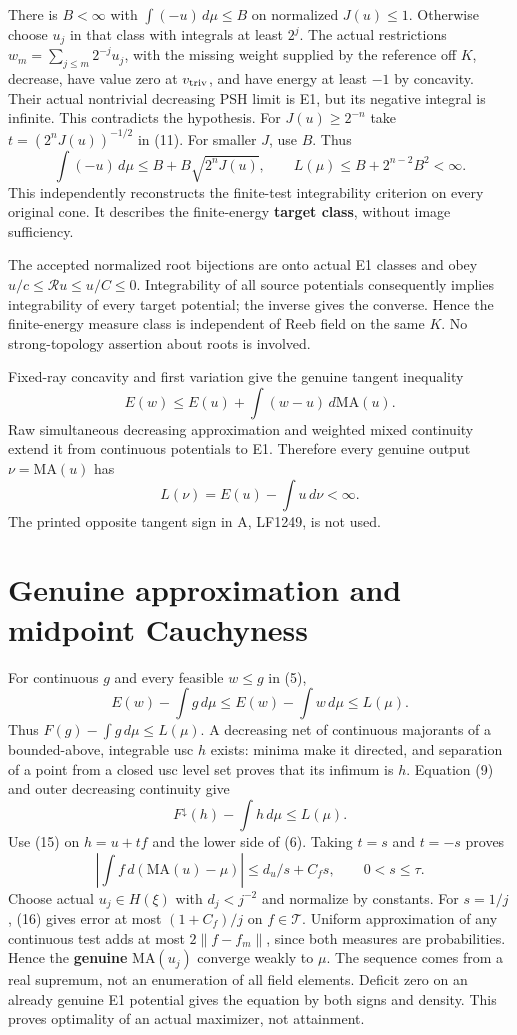 \documentclass[
  10pt,
]{article}
\begin{document}
There is \(B<\infty\) with \(\int(-u)\,d\mu\le B\) on normalized
\(J(u)\le1\). Otherwise choose \(u_j\) in that class with integrals at
least \(2^j\). The actual restrictions \(w_m=\sum_{j\le m}2^{-j}u_j\),
with the missing weight supplied by the reference off \(K\), decrease,
have value zero at \(v_{\rm triv}\), and have energy at least \(-1\) by
concavity. Their actual nontrivial decreasing PSH limit is E1, but its
negative integral is infinite. This contradicts the hypothesis. For
\(J(u)\ge2^{-n}\) take \(t=(2^nJ(u))^{-1/2}\) in (11). For smaller
\(J\), use \(B\). Thus \[\int(-u)\,d\mu\le B+B\sqrt{2^nJ(u)},\qquad
 L(\mu)\le B+2^{n-2}B^2<\infty. \tag{12}\] This independently
reconstructs the finite-test integrability criterion on every original
cone. It describes the finite-energy \textbf{target class}, without
image sufficiency.

The accepted normalized root bijections are onto actual E1 classes and
obey \(u/c\le\mathcal R u\le u/C\le0\). Integrability of all source
potentials consequently implies integrability of every target potential;
the inverse gives the converse. Hence the finite-energy measure class is
independent of Reeb field on the same \(K\). No strong-topology
assertion about roots is involved.

Fixed-ray concavity and first variation give the genuine tangent
inequality \[E(w)\le E(u)+\int(w-u)\,d\mathrm{MA}(u). \tag{13}\] Raw
simultaneous decreasing approximation and weighted mixed continuity
extend it from continuous potentials to E1. Therefore every genuine
output \(\nu=\mathrm{MA}(u)\) has
\[L(\nu)=E(u)-\int u\,d\nu<\infty. \tag{14}\] The printed opposite
tangent sign in A, LF1249, is not used.

\section{Genuine approximation and midpoint
Cauchyness}\label{genuine-approximation-and-midpoint-cauchyness}

For continuous \(g\) and every feasible \(w\le g\) in (5),
\[E(w)-\int g\,d\mu\le E(w)-\int w\,d\mu\le L(\mu).\] Thus
\(F(g)-\int g\,d\mu\le L(\mu)\). A decreasing net of continuous
majorants of a bounded-above, integrable usc \(h\) exists: minima make
it directed, and separation of a point from a closed usc level set
proves that its infimum is \(h\). Equation (9) and outer decreasing
continuity give \[F^\downarrow(h)-\int h\,d\mu\le L(\mu). \tag{15}\] Use
(15) on \(h=u+tf\) and the lower side of (6). Taking \(t=s\) and
\(t=-s\) proves \[
 \left|\int f\,d(\mathrm{MA}(u)-\mu)\right|\le d_u/s+C_fs,
 \qquad 0<s\le\tau. \tag{16}
\] Choose actual \(u_j\in H(\xi)\) with \(d_j<j^{-2}\) and normalize by
constants. For \(s=1/j\), (16) gives error at most \((1+C_f)/j\) on
\(f\in\mathcal T\). Uniform approximation of any continuous test adds at
most \(2\|f-f_m\|\), since both measures are probabilities. Hence the
\textbf{genuine} \(\mathrm{MA}(u_j)\) converge weakly to \(\mu\). The
sequence comes from a real supremum, not an enumeration of all field
elements. Deficit zero on an already genuine E1 potential gives the
equation by both signs and density. This proves optimality of an actual
maximizer, not attainment.
\end{document}
